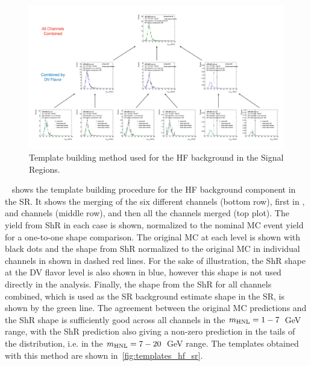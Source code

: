 \begin{figure}[!ht]
    \centering
    \includegraphics[width=\linewidth]{figures/analysis_strategy/template_building/template_building_SR.pdf}
    \caption{Template building method used for the HF background in the Signal Regions.}
    \label{fig:template_building}
\end{figure}

~ shows the template building procedure for the HF background component in the SR. It shows the merging of the six different channels (bottom row), first in \xuu, \xue and \xee channels (middle row), and then all the channels merged (top plot). The yield from ShR in each case is shown, normalized to the nominal MC event yield for a one-to-one shape comparison. The original MC at each level is shown with black dots and the shape from ShR normalized to the original MC in individual channels in shown in dashed red lines. For the sake of illustration, the ShR shape at the DV flavor level is also shown in blue, however this shape is not used directly in the analysis. Finally, the shape from the ShR for all channels combined, which is used as the SR background estimate shape in the SR, is shown by the green line. The agreement between the original MC predictions and the ShR shape is sufficiently good across all channels in the $m_{\mathrm{HNL}}=1-7$~GeV range, with the ShR prediction also giving a non-zero prediction in the tails of the distribution, i.e. in the $m_{\mathrm{HNL}}=7-20$~GeV range. The templates obtained with this method are shown in~\cref{fig:templates_hf_sr}. 

